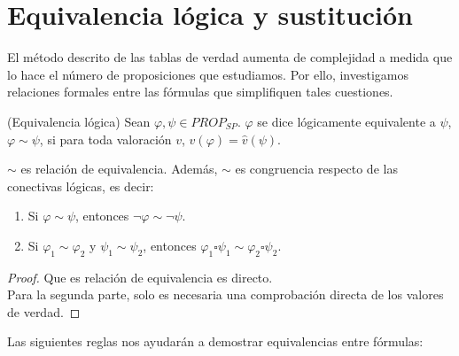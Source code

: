 \section{Equivalencia lógica y sustitución}

El método descrito de las tablas de verdad aumenta de complejidad a medida que lo hace el número de proposiciones que estudiamos. Por ello, investigamos relaciones formales entre las fórmulas que simplifiquen tales cuestiones. 

\begin{definition}(Equivalencia lógica) Sean $\varphi, \psi \in PROP_{SP}$. $\varphi$ se dice lógicamente equivalente a $\psi$, $\varphi \sim \psi$, si para toda valoración $v$, $\hat{v}(\varphi) = \hat{v}(\psi)$.
\end{definition}

\begin{prop} $\sim$ es relación de equivalencia. Además, $\sim$ es congruencia respecto de las conectivas lógicas, es decir:
\begin{enumerate}
    \item Si $\varphi \sim \psi$, entonces $\neg \varphi \sim \neg \psi$.
    \item Si $\varphi_1 \sim \varphi_2$ y $\psi_1 \sim \psi_2$, entonces $\varphi_1 \square \psi_1 \sim \varphi_2 \square \psi_2 $.
\end{enumerate}
\end{prop}
\begin{proof}
Que es relación de equivalencia es directo. \\
Para la segunda parte, solo es necesaria una comprobación directa de los valores de verdad.
\end{proof}

Las siguientes reglas nos ayudarán a demostrar equivalencias entre fórmulas:


